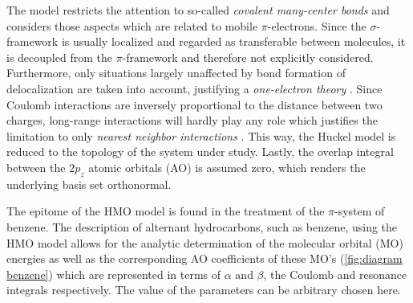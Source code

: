 \documentclass[twoside,twocolumn,9pt]{article}
\begin{document}
The model restricts the attention to so-called \emph{covalent many-center bonds} and considers those aspects which are related to mobile
$\pi$-electrons. Since the $\sigma$-framework is usually localized and regarded as transferable between molecules, it is decoupled from
the $\pi$-framework and therefore not explicitly considered. Furthermore, only situations largely unaffected by bond formation of delocalization are taken into account, justifying a \emph{one-electron theory} \cite{kutzelnigg2007}. Since Coulomb interactions are inversely proportional to the distance between two charges, long-range interactions will hardly play any role which justifies the limitation to only \emph{nearest neighbor interactions} \cite{kutzelnigg2007}. This way, the H$\ddot{\text{u}}$ckel model is reduced to the topology of the system under study. Lastly, the overlap integral between the $2p_z$ atomic orbitals (AO) is assumed zero, which
renders the underlying basis set orthonormal.

The epitome of the HMO model is found in the treatment of the $\pi$-system of benzene. The description of alternant hydrocarbons, such as benzene, using the HMO model allows for the analytic determination of the molecular orbital (MO) energies as well as the corresponding AO coefficients of these MO's (\cref{fig:diagram benzene}) which are represented in terms of $\alpha$ and $\beta$, the Coulomb and resonance integrals respectively. The value of the parameters can be arbitrary chosen here.
\end{document}

